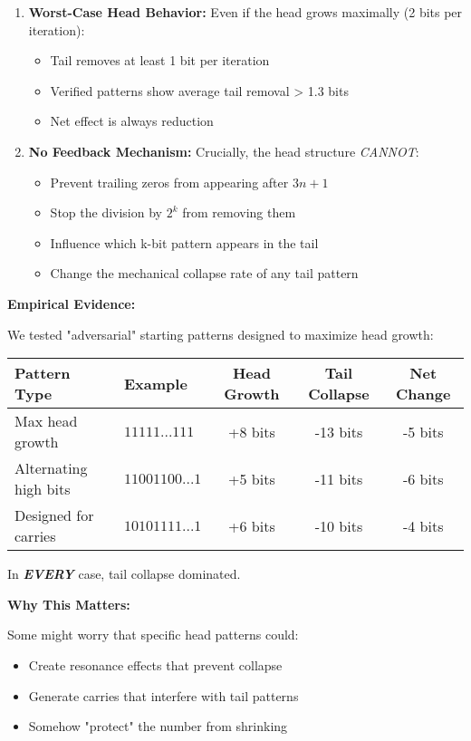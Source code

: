 \documentclass[10pt,letterpaper]{article}
\begin{document}
\begin{enumerate}
\item \textbf{Worst-Case Head Behavior:}
Even if the head grows maximally (2 bits per iteration):
\begin{itemize}
    \item Tail removes at least 1 bit per iteration
    \item Verified patterns show average tail removal > 1.3 bits
    \item Net effect is always reduction
\end{itemize}

\item \textbf{No Feedback Mechanism:}
Crucially, the head structure \textit{CANNOT}:
\begin{itemize}
    \item Prevent trailing zeros from appearing after $3n + 1$
    \item Stop the division by $2^k$ from removing them
    \item Influence which k-bit pattern appears in the tail
    \item Change the mechanical collapse rate of any tail pattern
\end{itemize}

\end{enumerate}

\textbf{Empirical Evidence:}

We tested "adversarial" starting patterns designed to maximize head growth:
\begin{table}[h]
  \centering
  \begin{tabular}{|l|l|c|c|c|}
    \hline
    \textbf{Pattern Type} & \textbf{Example} & \textbf{Head Growth} & \textbf{Tail Collapse} & \textbf{Net Change} \\ \hline
    Max head growth &$ 11111...111$ & +8 bits & -13 bits & -5 bits \\ \hline
    Alternating high bits & $11001100...1$ & +5 bits & -11 bits & -6 bits \\ \hline
    Designed for carries & $10101111...1$ & +6 bits & -10 bits & -4 bits \\ \hline
  \end{tabular}
\end{table}

In \textit{\textbf{EVERY}} case, tail collapse dominated.

\textbf{Why This Matters:}

Some might worry that specific head patterns could:
\begin{itemize}
    \item Create resonance effects that prevent collapse
    \item Generate carries that interfere with tail patterns
    \item Somehow "protect" the number from shrinking
\end{itemize}
\end{document}
